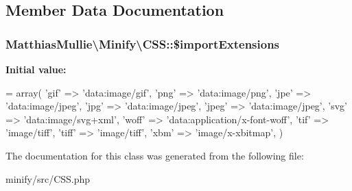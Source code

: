 \subsection{Member Data Documentation}
\subsubsection[{\texorpdfstring{\$import\+Extensions}{$importExtensions}}]{\setlength{\rightskip}{0pt plus 5cm}Matthias\+Mullie\textbackslash{}\+Minify\textbackslash{}\+C\+S\+S\+::\$import\+Extensions\hspace{0.3cm}{\ttfamily [protected]}}\hypertarget{classMatthiasMullie_1_1Minify_1_1CSS_a3d64d097fdfd18b29cca83645f1124c1}{}\label{classMatthiasMullie_1_1Minify_1_1CSS_a3d64d097fdfd18b29cca83645f1124c1}
{\bfseries Initial value\+:}
\begin{DoxyCode}
= array(
        \textcolor{stringliteral}{'gif'} => \textcolor{stringliteral}{'data:image/gif'},
        \textcolor{stringliteral}{'png'} => \textcolor{stringliteral}{'data:image/png'},
        \textcolor{stringliteral}{'jpe'} => \textcolor{stringliteral}{'data:image/jpeg'},
        \textcolor{stringliteral}{'jpg'} => \textcolor{stringliteral}{'data:image/jpeg'},
        \textcolor{stringliteral}{'jpeg'} => \textcolor{stringliteral}{'data:image/jpeg'},
        \textcolor{stringliteral}{'svg'} => \textcolor{stringliteral}{'data:image/svg+xml'},
        \textcolor{stringliteral}{'woff'} => \textcolor{stringliteral}{'data:application/x-font-woff'},
        \textcolor{stringliteral}{'tif'} => \textcolor{stringliteral}{'image/tiff'},
        \textcolor{stringliteral}{'tiff'} => \textcolor{stringliteral}{'image/tiff'},
        \textcolor{stringliteral}{'xbm'} => \textcolor{stringliteral}{'image/x-xbitmap'},
    )
\end{DoxyCode}


The documentation for this class was generated from the following file\+:\begin{DoxyCompactItemize}
\item 
minify/src/C\+S\+S.\+php\end{DoxyCompactItemize}

